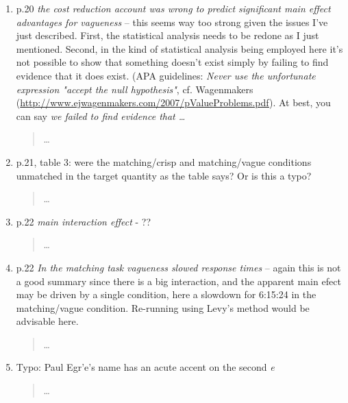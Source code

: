 \documentclass{tufte-handout}
\begin{document}
\begin{enumerate}
\item p.20 \emph{the cost reduction account was wrong to predict significant main effect advantages for vagueness} -- this seems way too strong given the issues I've just described. First, the statistical analysis needs to be redone as I just mentioned. Second, in the kind of statistical analysis being employed here it's not possible to show that something doesn't exist simply by failing to find evidence that it does exist. (APA guidelines: \emph{Never use the unfortunate expression "accept the null hypothesis"}, cf. Wagenmakers (\url{http://www.ejwagenmakers.com/2007/pValueProblems.pdf}). At best, you can say \emph{we failed to find evidence that \ldots}
\begin{quote}\ldots\end{quote}

\item p.21, table 3: were the matching/crisp and matching/vague conditions unmatched in the target quantity as the table says? Or is this a typo?
\begin{quote}\ldots\end{quote}

\item p.22 \emph{main interaction effect} - ??
\begin{quote}\ldots\end{quote}

\item p.22 \emph{In the matching task vagueness slowed response times} -- again this is not a good summary since there is a big interaction, and the apparent main efect may be driven by a single condition, here a slowdown for 6:15:24 in the matching/vague condition. Re-running using Levy's method would be advisable here.
\begin{quote}\ldots\end{quote}

\item Typo: Paul Egr\a'e's name has an acute accent on the second \emph{e}
\begin{quote}\ldots\end{quote}

\end{enumerate}
\end{document}
